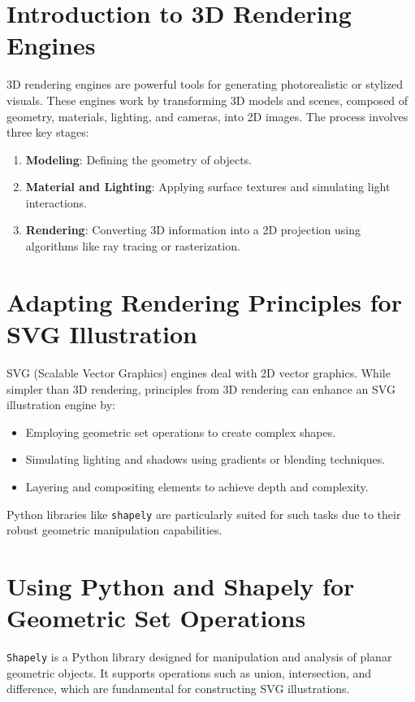 \maketitle

\section{Introduction to 3D Rendering Engines}
3D rendering engines are powerful tools for generating photorealistic or stylized visuals. These engines work by transforming 3D models and scenes, composed of geometry, materials, lighting, and cameras, into 2D images. The process involves three key stages:

\begin{enumerate}
    \item \textbf{Modeling}: Defining the geometry of objects.
    \item \textbf{Material and Lighting}: Applying surface textures and simulating light interactions.
    \item \textbf{Rendering}: Converting 3D information into a 2D projection using algorithms like ray tracing or rasterization.
\end{enumerate}

\section{Adapting Rendering Principles for SVG Illustration}
SVG (Scalable Vector Graphics) engines deal with 2D vector graphics. While simpler than 3D rendering, principles from 3D rendering can enhance an SVG illustration engine by:

\begin{itemize}
    \item Employing geometric set operations to create complex shapes.
    \item Simulating lighting and shadows using gradients or blending techniques.
    \item Layering and compositing elements to achieve depth and complexity.
\end{itemize}

Python libraries like \texttt{shapely} are particularly suited for such tasks due to their robust geometric manipulation capabilities.

\section{Using Python and Shapely for Geometric Set Operations}
\texttt{Shapely} is a Python library designed for manipulation and analysis of planar geometric objects. It supports operations such as union, intersection, and difference, which are fundamental for constructing SVG illustrations.

